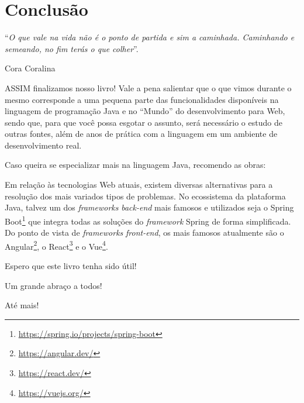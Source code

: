\chapter{Conclusão}
\epigraph{``\textit{O que vale na vida não é o ponto de partida e sim a caminhada. Caminhando e semeando, no fim terás o que colher}''.}{Cora Coralina}

\lettrine[lines=4, lhang=0.1, lraise=0, loversize=0.2, findent=0.1em]{\textcolor{corTema}{A}}{S}SIM finalizamos nosso livro! Vale a pena salientar que o que vimos durante o mesmo corresponde a uma pequena parte das funcionalidades disponíveis na linguagem de programação Java e no ``Mundo'' do desenvolvimento para Web, sendo que, para que você possa esgotar o assunto, será necessário o estudo de outras fontes, além de anos de prática com a linguagem em um ambiente de desenvolvimento real. 

Caso queira se especializar mais na linguagem Java, recomendo as obras:

Em relação às tecnologias Web atuais, existem diversas alternativas para a resolução dos mais variados tipos de problemas. No ecossistema da plataforma Java, talvez um dos \textit{frameworks} \textit{back-end} mais famosos e utilizados seja o Spring Boot\footnote{\url{https://spring.io/projects/spring-boot}} que integra todas as soluções do \textit{framework} Spring de forma simplificada. Do ponto de vista de \textit{frameworks} \textit{front-end}, os mais famosos atualmente são o Angular\footnote{\url{https://angular.dev/}}, o React\footnote{\url{https://react.dev/}} e o Vue\footnote{\url{https://vuejs.org/}}.

Espero que este livro tenha sido útil!

Um grande abraço a todos!

Até mais!